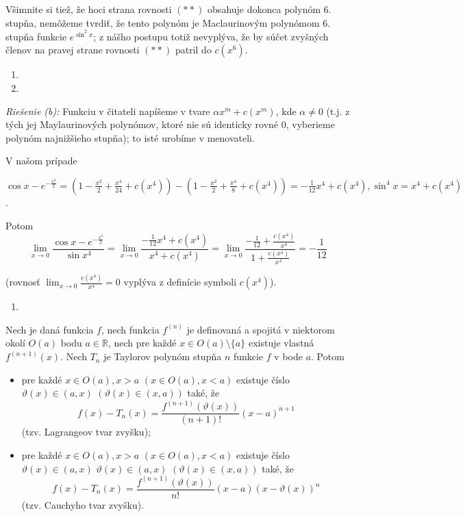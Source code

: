 Všimnite si tiež, že hoci strana rovnosti $(**)$ obsahuje dokonca polynóm $6.$ stupňa, nemôžeme tvrdiť, že tento polynóm je Maclaurinovým polynómom $6.$ stupňa funkcie $e^{\sin^2 x}$; z nášho postupu totiž nevyplýva, že by súčet zvyšných členov na pravej strane rovnosti $(**)$ patril do $c(x^6)$.

\begin{enumerate}[resume]
	\item {}
	\item {}
\end{enumerate}

\textit{Riešenie (b):}
Funkciu v čitateli napíšeme v tvare $\alpha x^m+c(x^m)$, kde $\alpha\neq 0$ (t.j. z tých jej Maylaurinových polynómov, ktoré nie sú identicky rovné $0$, vyberieme polynóm najnižšieho stupňa); to isté urobíme v menovateli.

V našom prípade

$\cos x -e^{-\frac{x^2}{2}}=(1-\frac{x^2}{2}+\frac{x^4}{24}+c(x^4))-(1-\frac{x^2}{2}+\frac{x^4}{8}+c(x^4))=-\frac{1}{12}x^4+c(x^4),\sin^4 x=x^4+c(x^4)$.

Potom
$$\lim_{x\rightarrow 0}\frac{\cos x -e^{-\frac{x^2}{2}}}{\sin x^4}=\lim_{x\rightarrow 0}\frac{-\frac{1}{12}x^4+c(x^4)}{x^4+c(x^4)}=\lim_{x\rightarrow 0}\frac{{-\frac{1}{12}}+\frac{c(x^4)}{x^4}}{1+\frac{c(x^4)}{x^4}}=-\frac{1}{12}$$

(rovnosť $\lim_{x\rightarrow 0}\frac{c(x^4)}{x^4}=0$ vyplýva z definície symboli $c(x^4)$).

\begin{enumerate}[resume]
	\item {}
\end{enumerate}

\begin{veta}
Nech je daná funkcia $f$, nech funkcia $f^{(n)}$ je definovaná a spojitá v niektorom okolí $O(a)$ bodu $a\in\mathbb{R}$, nech pre každé $x\in O(a)\setminus \{a\}$ existuje vlastná $f^{(n+1)}(x)$. Nech $T_n$ je Taylorov polynóm stupňa $n$ funkcie $f$ v bode $a$. Potom
\begin{itemize}
\item pre každé $x\in O(a),x>a$ $(x\in O(a),x<a)$ existuje číslo $\vartheta (x)\in (a,x)$  $(\vartheta (x)\in (x,a))$ také, že
$$f(x)-T_n(x)=\frac{f^{(n+1)}(\vartheta (x))}{(n+1)!}(x-a)^{n+1}$$
(tzv. Lagrangeov tvar zvyšku);
\item pre každé $x\in O(a),x>a$  $(x\in O(a),x<a)$ existuje číslo $\vartheta (x)\in (a,x)$  $\vartheta (x)\in (a,x)$  $(\vartheta (x)\in (x,a))$ také, že
$$f(x)-T_n(x)=\frac{f^{(n+1)}(\vartheta (x))}{n!}(x-a)(x-\vartheta (x))^n$$
(tzv. Cauchyho tvar zvyšku).
\end{itemize}
\end{veta}

